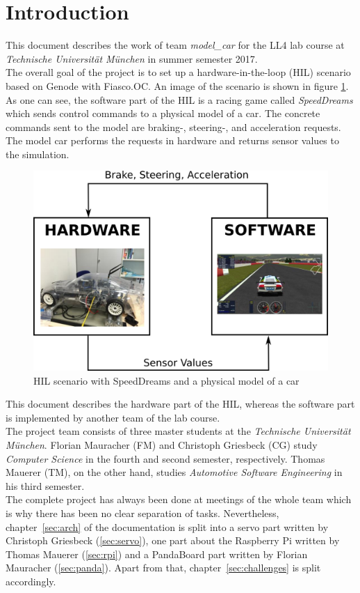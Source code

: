 \section{Introduction}
\label{sec:intro}
This document describes the work of team \textit{model\_car} for the LL4 lab course at \textit{Technische Universität München} in summer semester 2017. \\

The overall goal of the project is to set up a hardware-in-the-loop (HIL) scenario based on Genode with Fiasco.OC. An image of the scenario is shown in figure \ref{fig:hil}. As one can see, the software part of the HIL is a racing game called \textit{SpeedDreams} which sends control commands to a physical model of a car. The concrete commands sent to the model are braking-, steering-, and acceleration requests. The model car performs the requests in hardware and returns sensor values to the simulation. \\

\begin{figure}[h]
    \centering
    \includegraphics[width=0.7\linewidth]{images/hil}
    \caption{HIL scenario with SpeedDreams and a physical model of a car}
    \label{fig:hil}
\end{figure}

This document describes the hardware part of the HIL, whereas the software part is implemented by another team of the lab course. \\

The project team consists of three master students at the \textit{Technische Universität München}. Florian Mauracher (FM) and Christoph Griesbeck (CG) study \textit{Computer Science} in the fourth and second semester, respectively. Thomas Mauerer (TM), on the other hand, studies \textit{Automotive Software Engineering} in his third semester. \\

The complete project has always been done at meetings of the whole team which is why there has been no clear separation of tasks. Nevertheless, chapter~\ref{sec:arch} of the documentation is split into a servo part written by Christoph Griesbeck (\ref{sec:servo}), one part about the Raspberry Pi written by Thomas Mauerer (\ref{sec:rpi}) and a PandaBoard part written by Florian Mauracher (\ref{sec:panda}). Apart from that, chapter~\ref{sec:challenges} is split accordingly.
